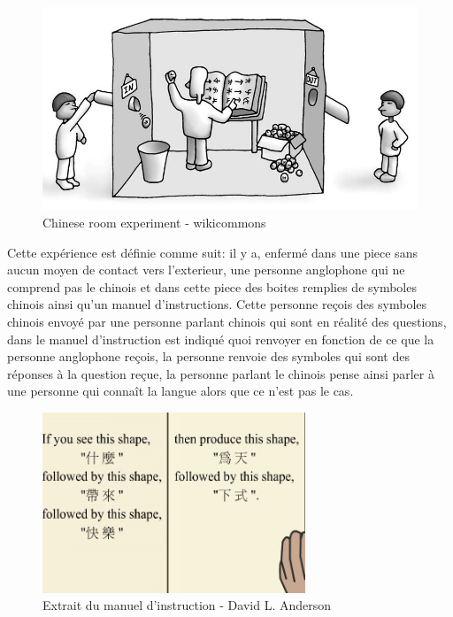 \begin{figure}[H]
    \centering
    \includegraphics[width=1\textwidth]{Images/chineseroom}
    \caption{Chinese room experiment - wikicommons}
	\label{fig:chineseroom}
\end{figure}

Cette expérience est définie comme suit: \newline
il y a, enfermé dans une piece sans aucun moyen de contact vers l'exterieur, une personne anglophone qui ne comprend
pas le chinois et dans cette piece des boites remplies de symboles chinois ainsi qu'un manuel d'instructions.
Cette personne reçois des symboles chinois envoyé par une personne parlant chinois qui sont en réalité des questions,
dans le manuel d'instruction est indiqué quoi renvoyer en fonction de ce que la personne anglophone reçois,
la personne renvoie des symboles qui sont des réponses à la question reçue, la personne parlant le chinois
pense ainsi parler à une personne qui connaît la langue alors que ce n'est pas le cas.

\begin{figure}[H]
    \centering
    \includegraphics[width=0.7\textwidth]{Images/chineserule}
    \caption{Extrait du manuel d'instruction - David L. Anderson}
	\label{fig:chineseroom}
\end{figure}

